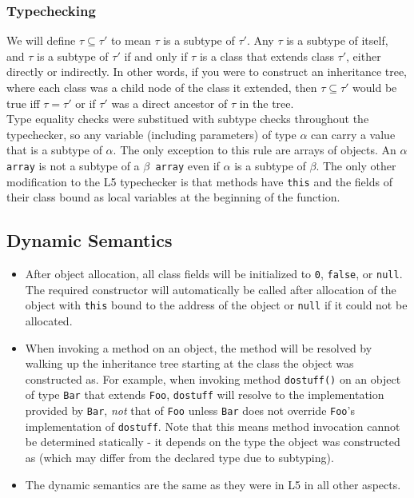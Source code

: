 \documentclass{article}
\begin{document}
\subsubsection{Typechecking}
We will define $\tau \subseteq \tau'$ to mean $\tau$ is a subtype of $\tau'$.
Any $\tau$ is a subtype of itself, and $\tau$ is a subtype of $\tau'$ if and only
if $\tau$ is a class that extends class $\tau'$, either directly or indirectly.
In other words, if you were to construct an inheritance tree, where each class
was a child node of the class it extended, then $\tau \subseteq \tau'$ would be
true iff $\tau = \tau'$ or if $\tau'$ was a direct ancestor of $\tau$ in the
tree. \\

Type equality checks were substitued with subtype checks throughout the
typechecker, so any variable (including parameters) of type $\alpha$ can carry
a value that is a subtype of $\alpha$. The only exception to this
rule are arrays of objects. An \texttt{$\alpha$ array} is not a subtype of a
\texttt{$\beta$ array} even if \texttt{$\alpha$} is a subtype of
\texttt{$\beta$}. The only other modification to the L5 typechecker is that
methods have \texttt{this} and the fields of their class bound as local
variables at the beginning of the function.

\subsection{Dynamic Semantics}
\begin{itemize}
\item After object allocation, all class fields will be initialized to \texttt{0},
      \texttt{false}, or \texttt{null}. The required constructor will
      automatically be called after allocation of the object with \texttt{this}
      bound to the address of the object or \texttt{null} if it could not be
      allocated.
\item When invoking a method on an object, the method will be resolved by
      walking up the inheritance tree starting at the class the object was
      constructed as. For example, when invoking
      method \texttt{dostuff()} on an object of type \texttt{Bar} that extends
      \texttt{Foo}, \texttt{dostuff} will resolve to the implementation provided
      by \texttt{Bar}, \emph{not} that of \texttt{Foo} unless \texttt{Bar} does
      not override \texttt{Foo}'s implementation of \texttt{dostuff}. Note that
      this means method invocation cannot be determined statically - it depends
      on the type the object was constructed as (which may differ from the
      declared type due to subtyping).
\item The dynamic semantics are the same as they were in L5 in all other aspects.
\end{itemize}
\end{document}
